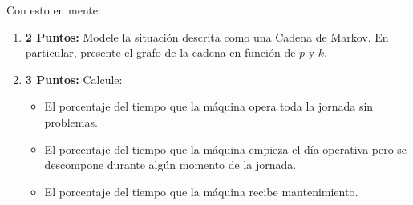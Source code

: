 \documentclass[ a4paper, twoside, 11pt]{article}
\begin{document}
\begin{problem}
Con esto en mente: 
\begin{enumerate}[label=\textbf{\alph*)}]
\item \textbf{2 Puntos:} Modele la situaci\'on descrita como una Cadena de Markov. En particular, presente el grafo de la cadena en funci\'on de $p$ y $k$. 
\item \textbf{3 Puntos:} Calcule: 
\begin{itemize}
\item El porcentaje del tiempo que la m\'aquina opera toda la jornada sin problemas. 
\item El porcentaje del tiempo que la m\'aquina empieza el d\'ia operativa pero se descompone durante alg\'un momento de la jornada. 
\item El porcentaje del tiempo que la m\'aquina recibe mantenimiento. 
\end{itemize}

\end{enumerate}

\end{problem}
\fullskip
\end{document}
